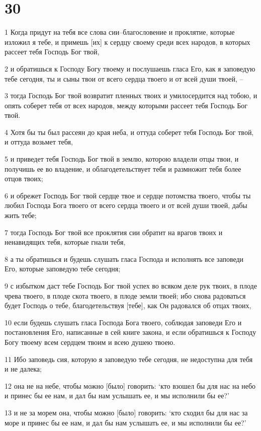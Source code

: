 \chapter{30}

\par 1 Когда придут на тебя все слова сии--благословение и проклятие, которые изложил я тебе, и примешь [их] к сердцу своему среди всех народов, в которых рассеет тебя Господь Бог твой,
\par 2 и обратишься к Господу Богу твоему и послушаешь гласа Его, как я заповедую тебе сегодня, ты и сыны твои от всего сердца твоего и от всей души твоей, --
\par 3 тогда Господь Бог твой возвратит пленных твоих и умилосердится над тобою, и опять соберет тебя от всех народов, между которыми рассеет тебя Господь Бог твой.
\par 4 Хотя бы ты был рассеян до края неба, и оттуда соберет тебя Господь Бог твой, и оттуда возьмет тебя,
\par 5 и приведет тебя Господь Бог твой в землю, которою владели отцы твои, и получишь ее во владение, и облагодетельствует тебя и размножит тебя более отцов твоих;
\par 6 и обрежет Господь Бог твой сердце твое и сердце потомства твоего, чтобы ты любил Господа Бога твоего от всего сердца твоего и от всей души твоей, дабы жить тебе;
\par 7 тогда Господь Бог твой все проклятия сии обратит на врагов твоих и ненавидящих тебя, которые гнали тебя,
\par 8 а ты обратишься и будешь слушать гласа Господа и исполнять все заповеди Его, которые заповедую тебе сегодня;
\par 9 с избытком даст тебе Господь Бог твой успех во всяком деле рук твоих, в плоде чрева твоего, в плоде скота твоего, в плоде земли твоей; ибо снова радоваться будет Господь о тебе, благодетельствуя [тебе], как Он радовался об отцах твоих,
\par 10 если будешь слушать гласа Господа Бога твоего, соблюдая заповеди Его и постановления Его, написанные в сей книге закона, и если обратишься к Господу Богу твоему всем сердцем твоим и всею душею твоею.
\par 11 Ибо заповедь сия, которую я заповедую тебе сегодня, не недоступна для тебя и не далека;
\par 12 она не на небе, чтобы можно [было] говорить: `кто взошел бы для нас на небо и принес бы ее нам, и дал бы нам услышать ее, и мы исполнили бы ее?'
\par 13 и не за морем она, чтобы можно [было] говорить: `кто сходил бы для нас за море и принес бы ее нам, и дал бы нам услышать ее, и мы исполнили бы ее?'
